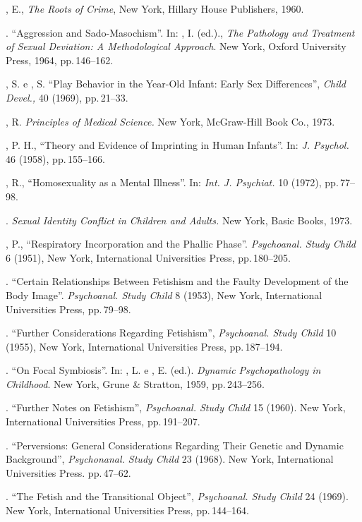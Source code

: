 \begin{description}
, E., \textit{The Roots of Crime}, New York, Hillary House Publishers,
1960.

. ``Aggression and Sado-Masochism''. In: , I. (ed.).,
\textit{The Pathology and Treatment of Sexual Deviation: A Methodological
Approach}. New York, Oxford University Press, 1964, pp.\,146--162.

, S. e , S. ``Play Behavior in the Year-Old Infant:
Early Sex Differences'', \textit{Child Devel., }40 (1969), pp.\,21--33.

, R. \textit{Principles of Medical Science.} New York, McGraw-Hill Book
Co., 1973.

, P. H., ``Theory and Evidence of Imprinting in Human
Infants''. In: \textit{J. Psychol.} 46 (1958), pp.\,155--166.

, R., ``Homosexuality as a Mental Illness''. In:
\textit{Int. J. Psychiat. }10 (1972), pp.\,77--98.

. \textit{Sexual Identity Conflict in Children and Adults.} New
York, Basic Books, 1973.

, P., ``Respiratory Incorporation and the Phallic
Phase''. \textit{Psychoanal. Study Child } 6 (1951), New
York, International Universities Press, pp.\,180--205.

. ``Certain Relationships Between Fetishism and the
Faulty Development of the Body Image''. \textit{Psychoanal. Study
Child }8 (1953), New York, International Universities Press, pp.\,79--98.

. ``Further Considerations Regarding
Fetishism'', \textit{Psychoanal. Study Child }10 (1955), New York, 
International Universities Press, pp.\,187--194.

. ``On Focal Symbiosis''. In: , L. e , E. 
(ed.). \textit{Dynamic Psychopathology in Childhood}. New York, 
Grune \& Stratton, 1959, pp.\,243--256.

. ``Further Notes on Fetishism'',
\textit{Psychoanal. Study Child } 15 (1960). New York, International
Universities Press, pp.\,191--207.

. ``Perversions: General Considerations Regarding
Their Genetic and Dynamic Background'', \textit{Psychonanal. Study
Child }23 (1968). New York, International Universities Press. pp.\,47--62.

. ``The Fetish and the Transitional
Object'', \textit{Psychoanal. Study Child } 24 (1969). New York, International 
Universities Press, pp.\,144--164.


\end{description}
